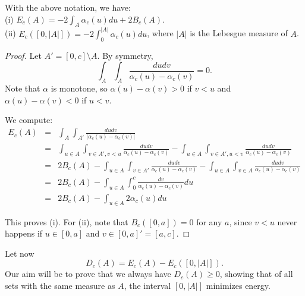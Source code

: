 \begin{lemma} \label{lem:EnergyInTermsOfInversion}
    With the above notation, we have:\\
    (i) $\displaystyle E_c(A) = -2 \int_A \alpha_c(u) du + 2 B_c (A).$\\
    (ii) $\displaystyle E_c([0,|A|]) = -2 \int_0^{|A|}\alpha_c(u) du$, where $|A|$ is the Lebesgue measure of $A$.
\end{lemma}
\begin{proof}
Let $A'=[0,c]\setminus A$. 
    By symmetry, $$\int_{A} \int_{A} \frac{dudv}{\alpha_c(u)-\alpha_c(v)}=0.$$ Note that $\alpha$ is monotone, so $\alpha(u)-\alpha(v)>0$ if $v<u$ and $\alpha(u)-\alpha(v)<0$ if $u<v$.  
    
    We compute:
    \begin{eqnarray*}
        E_c(A)&=& \int_{A}\int_{A'} \frac{dudv}{|\alpha_c(u)-\alpha_c(v)|} \\
        &=& \int_{u\in A}\int_{v\in A', v<u} \frac{dudv}{\alpha_c(u)-\alpha_c(v)} - \int_{u\in A}\int_{v\in A', u<v} \frac{dudv}{\alpha_c(u)-\alpha_c(v)} \\
        &=& 2 B_c(A) - \int_{u\in A} \int_{v\in A'} \frac{du dv}{\alpha_c(u)-\alpha_c(v)}  - \int_{u\in A}\int_{v\in A} \frac{du dv}{\alpha_c(u)-\alpha_c(v)} \\
        &=& 2B_c(A) - \int_{u\in A}\int_{0}^c \frac{dv}{\alpha_c(u)-\alpha_c(v)} du \\
        &=& 2B_c(A) - \int_{u\in A} 2\alpha_c(u) du
    \end{eqnarray*}

    This proves (i). For (ii), note that $B_c([0,a])=0$ for any $a$, since $v<u$ never happens if $u\in [0,a]$ and $v
    \in [0,a]'=[a,c]$.
\end{proof}

Let now $$D_c(A) = E_c(A) - E_c( [0,|A|]).$$  Our aim will be to prove that we always have $D_c(A)\geq 0$, showing that of all sets with the same measure as $A$, the interval $[0,|A|]$ minimizes energy.


